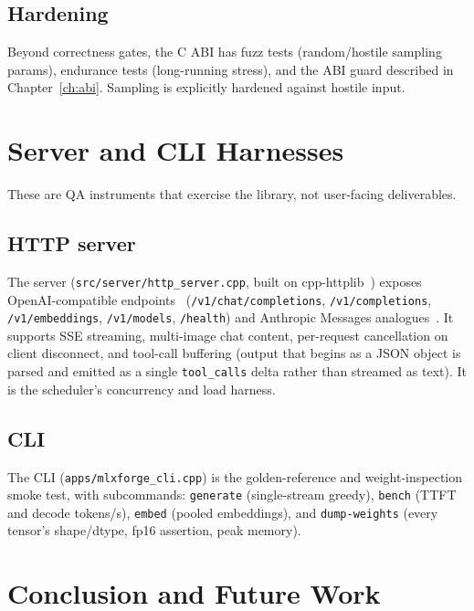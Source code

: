 \documentclass[11pt,a4paper]{report}
\newcommand{\code}[1]{\texttt{#1}}
\begin{document}
\section{Hardening}
Beyond correctness gates, the C ABI has fuzz tests (random/hostile sampling params),
endurance tests (long-running stress), and the ABI guard described in
Chapter~\ref{ch:abi}. Sampling is explicitly hardened against hostile input.

\chapter{Server and CLI Harnesses}
\label{ch:apps}

These are QA instruments that exercise the library, not user-facing deliverables.

\section{HTTP server}
The server (\code{src/server/http\_server.cpp}, built on
cpp-httplib~\citep{cpphttplib}) exposes OpenAI-compatible
endpoints~\citep{openai_api} (\code{/v1/chat/completions}, \code{/v1/completions},
\code{/v1/embeddings}, \code{/v1/models}, \code{/health}) and Anthropic Messages
analogues~\citep{anthropic_messages_api}. It supports SSE streaming, multi-image
chat content, per-request cancellation on client disconnect, and tool-call
buffering (output that begins as a JSON object is parsed and emitted as a single
\code{tool\_calls} delta rather than streamed as text). It is the scheduler's
concurrency and load harness.

\section{CLI}
The CLI (\code{apps/mlxforge\_cli.cpp}) is the golden-reference and
weight-inspection smoke test, with subcommands: \code{generate} (single-stream
greedy), \code{bench} (TTFT and decode tokens/s), \code{embed} (pooled embeddings),
and \code{dump-weights} (every tensor's shape/dtype, fp16 assertion, peak memory).

\chapter{Conclusion and Future Work}
\label{ch:conclusion}
\end{document}

